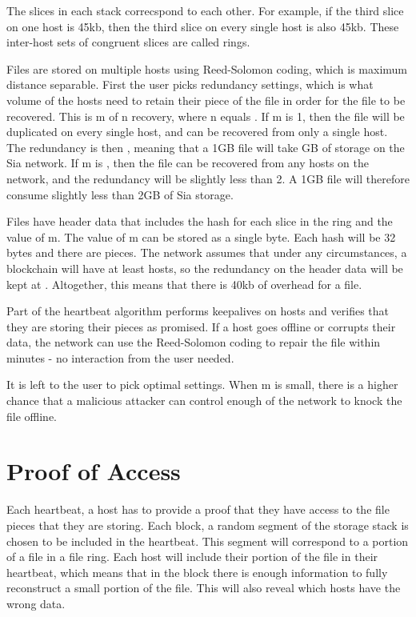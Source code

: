 \documentclass[twocolumn]{article}
\begin{document}
The slices in each stack correcspond to each other.
For example, if the third slice on one host is 45kb, then the third slice on every single host is also 45kb.
These inter-host sets of congruent slices are called rings.

Files are stored on multiple hosts using Reed-Solomon coding, which is maximum distance separable.
First the user picks redundancy settings, which is what volume of the hosts need to retain their piece of the file in order for the file to be recovered.
This is m of n recovery, where n equals \numhosts.
If m is 1, then the file will be duplicated on every single host, and can be recovered from only a single host.
The redundancy is then \numhosts{}, meaning that a 1GB file will take \numhosts GB of storage on the Sia network.
If m is \fiftyone, then the file can be recovered from any \fiftyone{} hosts on the network, and the redundancy will be slightly less than 2.
A 1GB file will therefore consume slightly less than 2GB of Sia storage.

Files have header data that includes the hash for each slice in the ring and the value of m.
The value of m can be stored as a single byte.
Each hash will be 32 bytes and there are \numhosts pieces.
The network assumes that under any circumstances, a blockchain will have at least \inversemaxcorruption hosts, so the redundancy on the header data will be kept at \maxredundancy.
Altogether, this means that there is 40kb of overhead for a file.

Part of the heartbeat algorithm performs keepalives on hosts and verifies that they are storing their pieces as promised.
If a host goes offline or corrupts their data, the network can use the Reed-Solomon coding to repair the file within minutes - no interaction from the user needed.

It is left to the user to pick optimal settings.
When m is small, there is a higher chance that a malicious attacker can control enough of the network to knock the file offline.

\section{Proof of Access}

Each heartbeat, a host has to provide a proof that they have access to the file pieces that they are storing.
Each block, a random \filechecksize{} segment of the storage stack is chosen to be included in the heartbeat.
This segment will correspond to a portion of a file in a file ring.
Each host will include their portion of the file in their heartbeat, which means that in the block there is enough information to fully reconstruct a small portion of the file.
This will also reveal which hosts have the wrong data.
\end{document}

